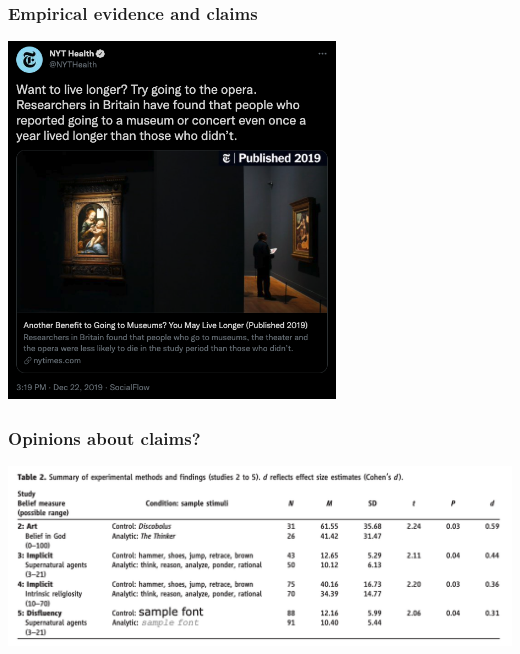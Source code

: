 \documentclass[aspectratio=43]{beamer}
\begin{document}
\begin{frame}
\frametitle{Empirical evidence and claims}
\centering

\includegraphics[width = 0.65\textwidth]{../img/nyt_museums}

\end{frame}




\begin{frame}
\frametitle{Opinions about claims?}
\centering

\includegraphics[width = \textwidth]{../img/psycho4}

\end{frame}
\end{document}
